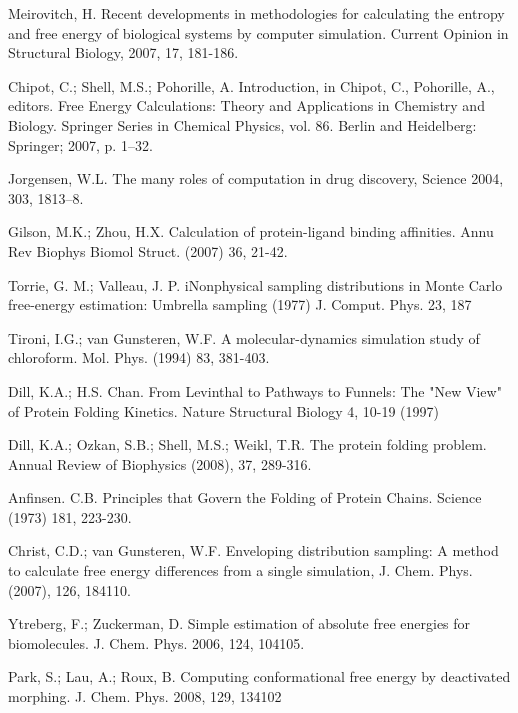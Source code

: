 \documentclass[12pt]{article}
\begin{document}
\begin{thebibliography}{99}

Meirovitch, H. Recent developments in methodologies for calculating the entropy and free energy of biological systems by computer simulation.
Current Opinion in Structural Biology, 2007, 17, 181-186.

Chipot, C.; Shell, M.S.; Pohorille, A. Introduction, in Chipot, C., Pohorille, A., editors. Free Energy
Calculations: Theory and Applications in Chemistry and Biology. Springer Series in Chemical
Physics, vol. 86. Berlin and Heidelberg: Springer; 2007, p. 1–32.

Jorgensen, W.L. The many roles of computation in drug discovery, Science 2004, 303, 1813–8.

Gilson, M.K.; Zhou, H.X. Calculation of protein-ligand binding affinities. Annu Rev Biophys Biomol Struct. (2007) 36, 21-42.

Torrie, G. M.; Valleau, J. P. iNonphysical sampling distributions in Monte Carlo free-energy estimation: Umbrella sampling 
(1977) J. Comput. Phys. 23, 187

Tironi, I.G.; van Gunsteren, W.F. A molecular-dynamics simulation study of chloroform. Mol. Phys. (1994) 83, 381-403.

Dill, K.A.; H.S. Chan.  From Levinthal to Pathways to Funnels:  The "New View" of Protein Folding Kinetics.  Nature Structural Biology 4, 10-19 (1997)

Dill, K.A.; Ozkan, S.B.; Shell, M.S.; Weikl, T.R. The protein folding problem. Annual Review of Biophysics (2008), 37, 289-316.

Anfinsen. C.B. Principles that Govern the Folding of Protein Chains. Science (1973) 181, 223-230.

Christ, C.D.; van Gunsteren, W.F. Enveloping distribution sampling: A method to calculate free energy differences from a single simulation,
J. Chem. Phys. (2007), 126, 184110.

Ytreberg, F.; Zuckerman, D. Simple estimation of absolute free energies for biomolecules. J. Chem. Phys. 2006, 124, 104105.

Park, S.; Lau, A.; Roux, B. Computing conformational free energy by deactivated morphing. J. Chem. Phys. 2008, 129, 134102


\end{thebibliography}
\end{document}
